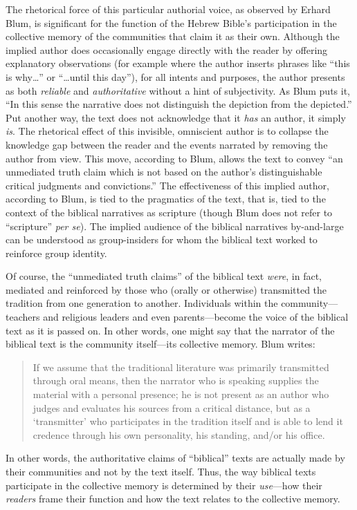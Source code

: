 The rhetorical force of this particular authorial voice, as observed by Erhard Blum, is significant for the function of the Hebrew Bible's participation in the collective memory of the communities that claim it as their own. Although the implied author does occasionally engage directly with the reader by offering explanatory observations (for example where the author inserts phrases like ``this is why\ldots{}'' or ``\ldots{}until this day''), for all intents and purposes, the author presents as both \emph{reliable} and \emph{authoritative} without a hint of subjectivity. As Blum puts it, ``In this sense the narrative does not distinguish the depiction from the depicted.''%
    \autocite[33]{blum_barton-etal2007}
Put another way, the text does not acknowledge that it \emph{has} an author, it simply \emph{is}. The rhetorical effect of this invisible, omniscient author is to collapse the knowledge gap between the reader and the events narrated by removing the author from view. This move, according to Blum, allows the text to convey ``an unmediated truth claim which is not based on the author's distinguishable critical judgments and convictions.''%
    \autocite[33]{blum_barton-etal2007}
The effectiveness of this implied author, according to Blum, is tied to the pragmatics of the text, that is, tied to the context of the biblical narratives as scripture (though Blum does not refer to ``scripture'' \emph{per se}). The implied audience of the biblical narratives by-and-large can be understood as group-insiders for whom the biblical text worked to reinforce group identity.

Of course, the ``unmediated truth claims'' of the biblical text \emph{were}, in fact, mediated and reinforced by those who (orally or otherwise) transmitted the tradition from one generation to another.%
    \autocite[33]{blum_barton-etal2007}
Individuals within the community---teachers and religious leaders and even parents---become the voice of the biblical text as it is passed on. In other words, one might say that the narrator of the biblical text is the community itself---its collective memory. Blum writes:

\begin{quote}
    If we assume that the traditional literature was primarily transmitted through oral means, then the narrator who is speaking supplies the material with a personal presence; he is not present as an author who judges and evaluates his sources from a critical distance, but as a `transmitter' who participates in the tradition itself and is able to lend it credence through his own personality, his standing, and/or his office.\autocite[33]{blum_barton-etal2007}
\end{quote}
\noindent
In other words, the authoritative claims of ``biblical'' texts are actually made by their communities and not by the text itself. Thus, the way biblical texts participate in the collective memory is determined by their \emph{use}---how their \emph{readers} frame their function and how the text relates to the collective memory. 


